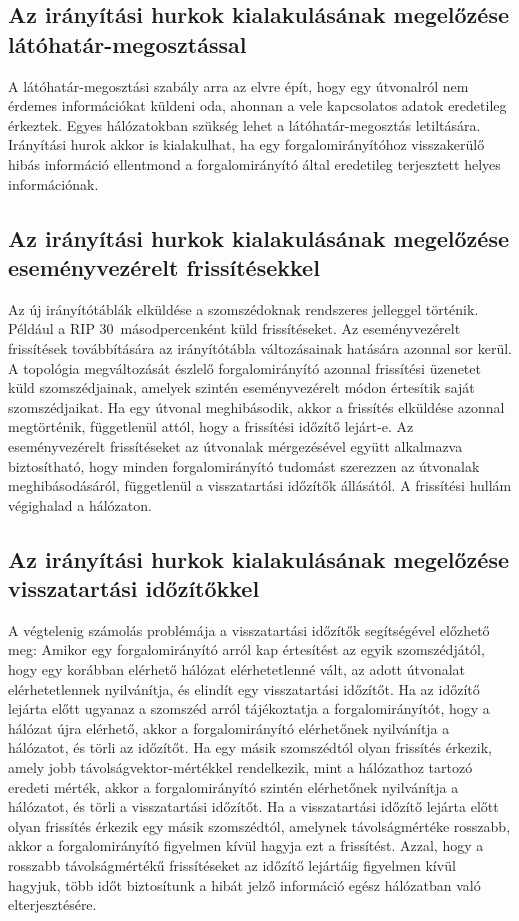 \subsection{Az irányítási hurkok kialakulásának megelőzése látóhatár-megosztással}
A látóhatár-megosztási szabály arra az elvre épít, hogy egy útvonalról nem érdemes információkat küldeni oda, ahonnan a vele kapcsolatos adatok eredetileg érkeztek. Egyes hálózatokban szükség lehet a látóhatár-megosztás letiltására. Irányítási hurok akkor is kialakulhat, ha egy forgalomirányítóhoz visszakerülő hibás információ ellentmond a forgalomirányító által eredetileg terjesztett helyes információnak.

\subsection{Az irányítási hurkok kialakulásának megelőzése eseményvezérelt frissítésekkel}
Az új irányítótáblák elküldése a szomszédoknak rendszeres jelleggel történik. Például a RIP 30~másodpercenként küld frissítéseket. Az eseményvezérelt frissítések továbbítására az irányítótábla változásainak hatására azonnal sor kerül. A topológia megváltozását észlelő forgalomirányító azonnal frissítési üzenetet küld szomszédjainak, amelyek szintén eseményvezérelt módon értesítik saját szomszédjaikat. Ha egy útvonal meghibásodik, akkor a frissítés elküldése azonnal megtörténik, függetlenül attól, hogy a frissítési időzítő lejárt-e. Az eseményvezérelt frissítéseket az útvonalak mérgezésével együtt alkalmazva biztosítható, hogy minden forgalomirányító tudomást szerezzen az útvonalak meghibásodásáról, függetlenül a visszatartási időzítők állásától. A frissítési hullám végighalad a hálózaton.

\subsection{Az irányítási hurkok kialakulásának megelőzése visszatartási időzítőkkel}
A végtelenig számolás problémája a visszatartási időzítők segítségével előzhető meg: Amikor egy forgalomirányító arról kap értesítést az egyik szomszédjától, hogy egy korábban elérhető hálózat elérhetetlenné vált, az adott útvonalat elérhetetlennek nyilvánítja, és elindít egy visszatartási időzítőt. Ha az időzítő lejárta előtt ugyanaz a szomszéd arról tájékoztatja a forgalomirányítót, hogy a hálózat újra elérhető, akkor a forgalomirányító elérhetőnek nyilvánítja a hálózatot, és törli az időzítőt. Ha egy másik szomszédtól olyan frissítés érkezik, amely jobb távolságvektor-mértékkel rendelkezik, mint a hálózathoz tartozó eredeti mérték, akkor a forgalomirányító szintén elérhetőnek nyilvánítja a hálózatot, és törli a visszatartási időzítőt. Ha a visszatartási időzítő lejárta előtt olyan frissítés érkezik egy másik szomszédtól, amelynek távolságmértéke rosszabb, akkor a forgalomirányító figyelmen kívül hagyja ezt a frissítést. Azzal, hogy a rosszabb távolságmértékű frissítéseket az időzítő lejártáig figyelmen kívül hagyjuk, több időt biztosítunk a hibát jelző információ egész hálózatban való elterjesztésére.

